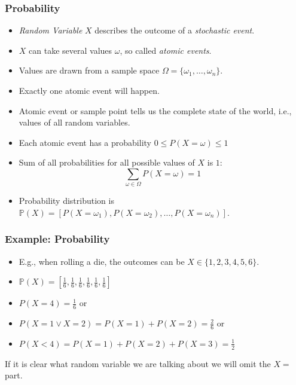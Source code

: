 \documentclass[xcolor=dvipsnames,ignorenonframetext]{beamer}
\newcommand{\Pb}{\mathbb{P}}
\begin{document}
\begin{frame}
  \frametitle{Probability}
  \begin{itemize}
  \item \emph{Random Variable} $X$ describes the outcome of a \emph{stochastic
      event}.
  \item $X$ can take several values $\omega$, so called \emph{atomic events}.
  \item Values are drawn from a sample space $\Omega=\{\omega_1,\ldots,\omega_n\}$.
  \item Exactly one atomic event will happen.
  \item Atomic event or sample point tells us the complete state of the world,
    i.e., values of all random variables.
  \item Each atomic event has a probability $0 \leq P(X=\omega)\leq 1$
  \item Sum of all probabilities for all possible values of $X$ is $1$:
    \[\sum_{\omega\in\Omega}P(X=\omega)=1\]
  \item Probability distribution is
    $\Pb(X)=[P(X=\omega_1),P(X=\omega_2),\ldots,P(X=\omega_n)]$.
  \end{itemize}
\end{frame}

\begin{frame}
  \frametitle{Example: Probability}
  \begin{itemize}
  \item E.g., when rolling a die, the outcomes can be $X\in\{1,2,3,4,5,6\}$.
  \item $\Pb(X)=[\frac{1}{6}, \frac{1}{6}, \frac{1}{6}, \frac{1}{6}, \frac{1}{6}, \frac{1}{6}]$
  \item $P(X=4)=\frac{1}{6}$ or
  \item $P(X=1 \vee X=2)=P(X=1)+P(X=2)=\frac{2}{6}$ or
  \item $P(X<4)=P(X=1)+P(X=2)+P(X=3)=\frac{1}{2}$
  \end{itemize}
  If it is clear what random variable we are talking about we will omit the $X=$ part.
\end{frame}
\end{document}
